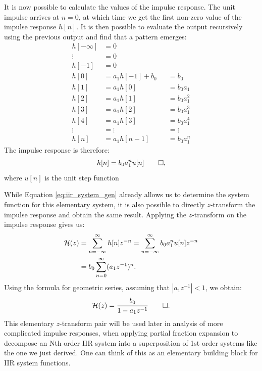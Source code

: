 It is now possible to calculate the values of the impulse
response. The unit impulse arrives at $n=0$, at which time we get the
first non-zero value of the impulse response $h[n]$. It is then possible to evaluate the output
recursively using the previous output and find that a pattern emerges:
\begin{align}
    h[-\infty] & = 0               &  &             \\
    \vdots     & = 0               &  &             \\
    h[-1]      & = 0               &  &             \\
    h[0]       & = a_1 h[-1] + b_0 &  & = b_0       \\
    h[1]       & = a_1 h[0]        &  & = b_0 a_1   \\
    h[2]       & = a_1 h[1]        &  & = b_0 a_1^2 \\
    h[3]       & = a_1 h[2]        &  & = b_0 a_1^3 \\
    h[4]       & = a_1 h[3]        &  & = b_0 a_1^4 \\
    \vdots     & = \vdots          &  & = \vdots    \\
    h[n]       & = a_1 h[n-1]      &  & = b_0 a_1^n
\end{align}
The impulse response is therefore:
\begin{equation}
    h[n] =  b_0 a_1^n u[n]\qed,
\end{equation}
where $u[n]$ is the unit step function

While Equation \ref{eq:iir_system_gen} already allows us to determine the system function for this
elementary system, it is also possible to directly $z$-transform the impulse response and
obtain the same result. Applying the $z$-transform on the impulse response gives us:
\begin{align}
    \mathcal{H}(z) & = \sum_{n=-\infty}^{\infty} h[n] z^{-n} = \sum_{n=-\infty}^{\infty}  b_0 a_1^n u[n] z^{-n} \\
         & =  b_0 \sum_{n=0}^{\infty} (a_1 z^{-1})^n.
\end{align}
Using the formula for geometric series, assuming that $|a_1 z^{-1}|<1$,
we obtain:
\begin{equation}
    \mathcal{H}(z) = \frac{b_0}{1-a_1 z^{-1}}\qed.
\end{equation}
This elementary $z$-transform pair will be used later in analysis of
more complicated impulse responses, when applying partial fraction
expansion to decompose an Nth order IIR system into a superposition of
1st order systems like the one we just derived. One can think of this
as an elementary building block for IIR system functions.

